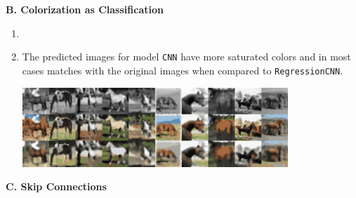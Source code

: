 \documentclass[11pt]{article}
\begin{document}
\textbf{B. Colorization as Classification}


\begin{enumerate}
    \item 
    \item The predicted images for model \texttt{CNN} have more saturated colors and in most cases matches with the original images when compared to \texttt{RegressionCNN}.
    \begin{center}
        \includegraphics[width=10cm]{eval_CNN.png}
    \end{center}
\end{enumerate}


\textbf{C. Skip Connections}
\end{document}
